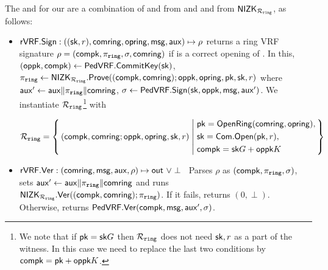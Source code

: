 \noindent The \Sign and \Verify for  our \rVRF are a combination of \Sign and \Verify from \PedVRF and
\Prove and \Verify from ${\mathsf{NIZK}}_{\mathcal{R}_{\mathtt{ring}}}$, as follows:
\def\tmpaux{\aux \doubleplus \piring \doubleplus \comring}
\def\tmpeprintaux{\eprint{\aux'}{\tmpaux}}
\def\tmpindent{\hspace*{5pt}}
\begin{itemize}
	
	\item ${\mathsf{rVRF}}.{\mathsf{Sign}} : ((\mathsf{sk},r),\mathsf{comring}, \mathsf{opring},\mathsf{msg},\mathsf{aux}) \mapsto \rho$
	returns a ring VRF signature $\rho = (\mathsf{compk},\pi_{\mathtt{ring}},\sigma, \mathsf{comring})$
	if \openring is a correct opening of \comring.  In this, $(\mathsf{oppk},\mathsf{compk}) \leftarrow {\ensuremath{\mathsf{PedVRF}}}.{\mathsf{CommitKey}}(\mathsf{sk})$,  $\pi_{\mathtt{ring}} \leftarrow {\ensuremath{\mathsf{NIZK}}}_{\mathcal{R}_{\mathtt{ring}}}.{\mathsf{Prove}}((\mathsf{compk},\mathsf{comring}); \mathsf{oppk},\mathsf{opring}, \mathsf{pk},\mathsf{sk},r)$ where  $\aux' \leftarrow \tmpaux$,  $\sigma \leftarrow {\ensuremath{\mathsf{PedVRF}}}.{\mathsf{Sign}}(\mathsf{sk},\mathsf{oppk},\mathsf{msg}, \mathsf{aux}')$.  We instantiate  $ \mathcal{R}_{\mathtt{ring}} 
	$\footnote{We note that if $ \mathsf{pk} = \mathsf{sk}G $ then $ \mathcal{R}_{\mathtt{ring}} $ does not need $ \mathsf{sk},r $ as a part of the witness. In this case we need to replace the last two conditions by $ \mathsf{compk} = \mathsf{pk} + \mathsf{oppk} K $.} with

	
	$$ \Rring = \Setst{ (\compk,\comring ;\openpk,\openring,\sk,r) }{
		\begin{aligned}
			&	\pk = \OpenRing(\comring,\openring), \\
			& 	\sk = \mathsf{Com}.\mathsf{Open}(\pk,r), \\
			& 	\compk = \sk \genG + \openpk \genB
		\end{aligned}	
	}$$
	\item ${\mathsf{rVRF}}.{\mathsf{Ver}} : (\mathsf{comring},\mathsf{msg},\mathsf{aux},\rho) \mapsto {\ensuremath{\mathsf{out}}} \,\, \lor \perp$ \,
	Parses $\rho$ as $(\mathsf{compk},\pi_{\mathtt{ring}},\sigma)$,  sets $\aux' \leftarrow \tmpaux$ and runs ${\mathsf{NIZK}}_{\mathcal{R}_{\mathtt{ring}}}.{\mathsf{Ver}}((\mathsf{compk},\mathsf{comring}); \pi_{\mathtt{ring}})$.
	If it fails, returns $ (0,\perp) $. Otherwise, returns ${\mathsf{PedVRF}}.{\mathsf{Ver}}(\mathsf{compk},\mathsf{msg}, \mathsf{aux}', \sigma)$.
\end{itemize}









